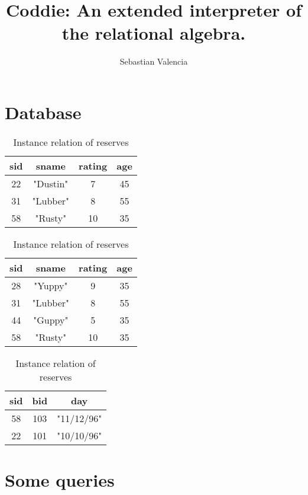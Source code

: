\documentclass{article}
\title{Coddie: An extended interpreter of the relational algebra.}
\author{Sebastian Valencia}
\begin{document}
	\thispagestyle{empty}
	
	\begin{landscape}
		
		\section{Database}
		
		\begin{table}[!htb]
			\caption{Some relations, a sample database: SAILORS}
			\begin{minipage}{.5\linewidth}
				\caption{Relation, sailors1}
				\centering
				\begin{tabular}{||c c c c||}
					\hline
					sid & sname & rating & age \\ [0.5ex]
					\hline\hline
					22 & "Dustin" & 7 & 45 \\
					31 & "Lubber" & 8 & 55 \\
					58 & "Rusty" & 10 & 35 \\ [1ex]
					\hline
				\end{tabular}
			\end{minipage}%
			\begin{minipage}{.5\linewidth}
				\centering
				\caption{Relation, sailors2}
				\begin{tabular}{||c c c c||}
					\hline
					sid & sname & rating & age \\ [0.5ex]
					\hline\hline
					28 & "Yuppy" & 9 & 35 \\
					31 & "Lubber" & 8 & 55 \\
					44 & "Guppy" & 5 & 35 \\
					58 & "Rusty" & 10 & 35 \\ [1ex]
					\hline
				\end{tabular}
			\end{minipage} 
			\begin{minipage}{.5\linewidth}
				\centering
				\caption{Instance relation of reserves}
				\begin{tabular}{||c c c||}
					\hline
					sid & bid & day \\ [0.5ex]
					\hline\hline
					58 & 103 & "11/12/96" \\
					22 & 101 & "10/10/96" \\ [1ex]
					\hline
				\end{tabular}
			\end{minipage} 
		\end{table}
		
		\section{Some queries}
		

\end{landscape}
\end{document}
